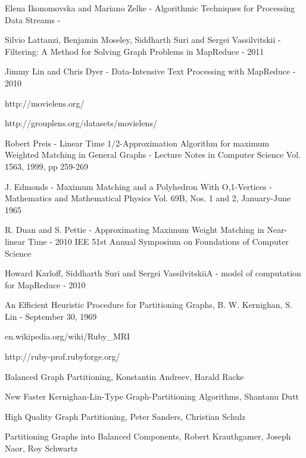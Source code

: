  \begin{thebibliography}{99}

  Elena Ikonomovska and Mariano Zelke - Algorithmic Techniques for Processing Data Streams -

  Silvio Lattanzi, Benjamin Moseley, Siddharth Suri and Sergei Vassilvitskii -Filtering: A Method for Solving Graph Problems in MapReduce - 2011
  
  Jimmy Lin and Chris Dyer - Data-Intensive Text Processing with MapReduce - 2010
  
  http://movielens.org/
  
  http://grouplens.org/datasets/movielens/
  
  Robert Preis - Linear Time 1/2-Approximation Algorithm for maximum Weighted Matching in General Graphs - Lecture Notes in Computer Science Vol. 1563, 1999, pp 259-269
  
  J. Edmonds - Maximum Matching and a Polyhedron With O,1-Vertices - Mathematics and Mathematical Physics Vol. 69B, Nos. 1 and 2, January-June 1965

  R. Duan and S. Pettie - Approximating Maximum Weight Matching in Near-linear Time - 2010 IEE 51st Annual Symposium on Foundations of Computer Science

  Howard Karloff, Siddharth Suri and Sergei VassilvitskiiA -  model of computation for MapReduce - 2010

  An Efficient Heuristic Procedure for Partitioning Graphs, B. W. Kernighan, S. Lin - September 30, 1969
  
  en.wikipedia.org/wiki/Ruby\_MRI
  
  http://ruby-prof.rubyforge.org/
  
  Balanced Graph Partitioning, Konstantin Andreev, Harald Racke
  
  New Faster Kernighan-Lin-Type Graph-Partitioning Algorithms, Shantanu Dutt

  High Quality Graph Partitioning, Peter Sanders, Christian Schulz

  Partitioning Graphs into Balanced Components,
  Robert Krauthgamer, Joseph Naor, Roy Schwartz
  
  \end{thebibliography}
